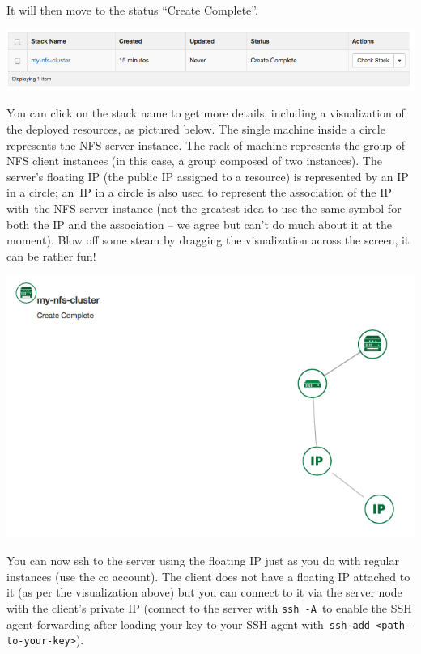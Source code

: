 It will then move to the status ``Create Complete''.

\includegraphics[width=\columnwidth]{images/chameleon/Create-Complete_XkoWhlj.png}

You can click on the stack name to get more details, including a
visualization of the deployed resources, as pictured below. The single
machine inside a circle represents the NFS server instance. The rack of
machine represents the group of NFS client instances (in this case, a
group composed of two instances). The server's floating IP (the public
IP assigned to a resource) is represented by an IP in a circle; an~IP in
a circle is also used to represent the association of the IP with~the
NFS server instance (not the greatest idea to use the same symbol for
both the IP and the association -- we agree but can't do much about it
at the moment). Blow off some steam by dragging the visualization across
the screen, it can be rather fun!

\includegraphics[width=\columnwidth]{images/chameleon/Stack-visualization.png}

You can now ssh to the server using the floating IP just as you do with
regular instances (use the cc account). The client does not have a
floating IP attached to it (as per the visualization above) but you can
connect to it via the server node with the client's private IP (connect
to the server with \texttt{ssh\ -A}~to enable the SSH agent forwarding
after loading your key to your SSH agent
with~\texttt{ssh-add\ \textless{}path-to-your-key\textgreater{}}).

